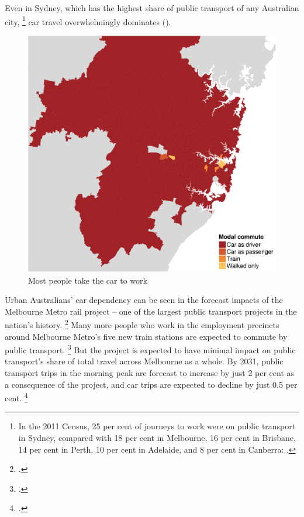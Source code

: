 \documentclass{grattan}
\begin{document}
Even in Sydney, which has the highest share of public transport of any Australian city,%
    \footnote{In the 2011 Census, 25 per cent of journeys to work were on public transport in Sydney, compared with 18 per cent in Melbourne, 16 per cent in Brisbane, 14 per cent in Perth, 10 per cent in Adelaide, and 8 per cent in Canberra: \textcites{ABS2011Census}[][3]{2014-BITRE-Urban-public-transport:-updated-trends}.}
car travel overwhelmingly dominates ().

\begin{figure}
\caption{Most people take the car to work \label{fig:Mode-of-travel}}
\includegraphics{atlas/Main-mode-of-transport--Sydneya-1-crop.pdf}
\end{figure}

Urban Australians' car dependency can be seen in the forecast impacts of the Melbourne Metro rail project -- one of the largest public transport projects in the nation's history.%
    \footcite{MelbourneMetro-2016-BizCase}
Many more people who work in the employment precincts around Melbourne Metro's five new train stations are expected to commute by public transport.%
    \footcite[][166--167]{MelbourneMetro-2016-BizCase}
But the project is expected to have minimal impact on public transport's share of total travel across Melbourne as a whole. By 2031, public transport trips in the morning peak are forecast to increase by just 2 per cent as a consequence of the project, and car trips are expected to decline by just 0.5 per cent.%
    \footcite{Urbanist-2016-Melb-metro-What-do-you-get-for-10bn}
\end{document}
